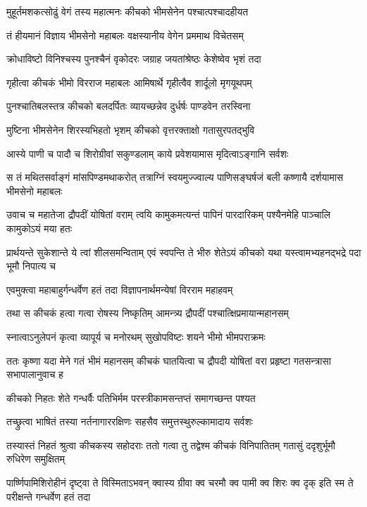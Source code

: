 \twolineshloka
{मुहूर्तमशकत्सोढुं वेगं तस्य महात्मनः}
{कीचको भीमसेनेन पश्चात्पश्चादहीयत}


\twolineshloka
{तं हीयमानं विज्ञाय भीमसेनो महाबलः}
{वक्षस्यानीय वेगेन प्रममाथ विचेतसम्}


\twolineshloka
{क्रोधाविष्टो विनिश्चस्य पुनश्चैनं वृकोदरः}
{जग्राह जयतांश्रेष्ठः केशेष्वेव भृशं तदा}


\twolineshloka
{गृहीत्वा कीचकं भीमो विरराज महाबलः}
{आमिषार्थे गृहीत्वैव शार्दूलो मृगयूथपम्}


\twolineshloka
{पुनश्चातिबलस्तत्र कीचको बलदर्पितः}
{व्यायच्छन्नेव दुर्धर्षः पाण्डवेन तरस्विना}


\twolineshloka
{मुष्टिना भीमसेनेन शिरस्यभिहतो भृशम्}
{कीचको वृत्तरक्ताक्षो गतासुरपतद्भुवि}


\twolineshloka
{आस्ये पाणी च पादौ च शिरोग्रीवां सकुण्डलाम्}
{काये प्रवेशयामास मृदित्वाऽङ्गानि सर्वशः}


\onelineshloka
{स तं मथितसर्वाङ्गं मांसपिण्डमथाकरोत्}
\twolineshloka
{तत्राग्निं स्वयमुज्ज्वाल्य पाणिसङ्घर्षजं बली}
{कष्णायै दर्शयामास भीमसेनो महाबलः}


\threelineshloka
{उवाच च महातेजा द्रौपदीं योषितां वराम्}
{त्वयि कामुकमत्यन्तं पापिनं पारदारिकम्}
{पश्यैनमेहि पाञ्चालि कामुकोऽयं मया हतः}


\threelineshloka
{प्रार्थयन्ते सुकेशान्ते ये त्वां शीलसमन्विताम्}
{एवं स्वपन्ति ते भीरु शेतेऽयं कीचको यथा}
{यस्त्वामभ्यहनद्भद्रे पदा भूमौ निपात्य च}


\twolineshloka
{एवमुक्त्वा महाबाहुर्गन्धर्वेण हतं तदा}
{विज्ञापनार्थमन्येषां विरराम महाहवम्}


\twolineshloka
{तथा स कीचकं हत्वा गत्वा रोषस्य निष्कृतिम्}
{आमन्त्र्य द्रौपदीं पश्चात्क्षिप्रमायान्महानसम्}


\twolineshloka
{स्नात्वाऽनुलेपनं कृत्वा व्यापूर्य च मनोरथम्}
{सुखोपविष्टः शयने भीमो भीमपराक्रमः}


\threelineshloka
{ततः कृष्णा यदा मेने गतं भीमं महानसम्}
{कीचकं घातयित्वा च द्रौपदी योषितां वरा}
{प्रहृष्टा गतसन्त्रासा सभापालानुवाच ह}


\twolineshloka
{कीचको निहतः शेते गन्धर्वैः पतिभिर्मम}
{परस्त्रीकामसन्तप्तं समागच्छन्त पश्यत}


\twolineshloka
{तच्छ्रुत्वा भाषितं तस्या नर्तनागाररक्षिणः}
{सहसैव समुत्तस्थुरुल्कामादाय सर्वशः}


\threelineshloka
{तस्यास्तं निहतं श्रुत्वा कीचकस्य सहोदराः}
{ततो गत्वा तु तद्वेश्म कीचकं विनिपातितम्}
{गतासुं ददृशुर्भूमौ रुधिरेण समुक्षितम्}


\onelineshloka
{पार्ष्णिपामिशिरोहीनं दृष्ट्वा ते विस्मिताऽभवन्}
\twolineshloka
{क्वास्य ग्रीवा क्व चरमौ क्व पामी क्व शिरः क्व दृक्}
{इति स्म ते परीक्षन्ते गन्धर्वेण हतं तदा}


